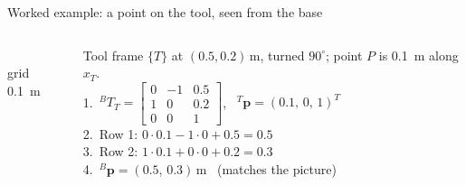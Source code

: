 \documentclass[aspectratio=169,10pt]{beamer}
\newcommand{\triad}[4]{\begin{scope}[shift={(#1,#2)},rotate=#3]
  \draw[ax,mkOrange] (0,0) -- (.7,0) node[right,font=\tiny]{$x_{#4}$};
  \draw[ax,mkMid] (0,0) -- (0,.7) node[above,font=\tiny]{$y_{#4}$};
  \fill[mkNavy] (0,0) circle (.04);\end{scope}}
\begin{document}
\begin{frame}[t]{Worked example: a point on the tool, seen from the base}
\begin{columns}[T,onlytextwidth]
\centering
{}\\
{\scriptsize grid \SI{0.1}{m}}
\begin{keybox}
\small
Tool frame $\{T\}$ at $(0.5,0.2)$\,m, turned $90^\circ$; point $P$ is \SI{0.1}{m} along $x_T$.\\[1mm]
1.\ ${}^BT_T=\begin{bmatrix}0&-1&0.5\\1&0&0.2\\0&0&1\end{bmatrix}$, \ ${}^T\bm p=(0.1,\,0,\,1)^T$\\[1mm]
2.\ Row 1: $0\cdot0.1-1\cdot0+0.5=0.5$\\
3.\ Row 2: $1\cdot0.1+0\cdot0+0.2=0.3$\\[1mm]
4.\ ${}^B\bm p=(0.5,\,0.3)$\,m \checkmark\ (matches the picture)
\end{keybox}
\end{columns}
\end{frame}
\end{document}

